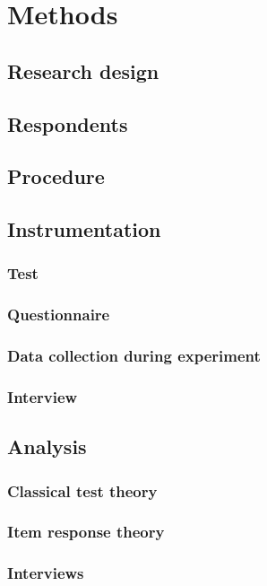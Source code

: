 \chapter{Methods}
\label{ch:methods}

\section{Research design}
\label{sec:researchdesign}

\section{Respondents}
\label{sec:respondents}

\section{Procedure}
\label{sec:procedure}



\section{Instrumentation}
\label{sec:instrumentation}

\subsection{Test}

\subsection{Questionnaire}

\subsection{Data collection during experiment}

\subsection{Interview}

\section{Analysis}
\label{sec:analysis}

\subsection{Classical test theory}

\subsection{Item response theory}

\subsection{Interviews}
